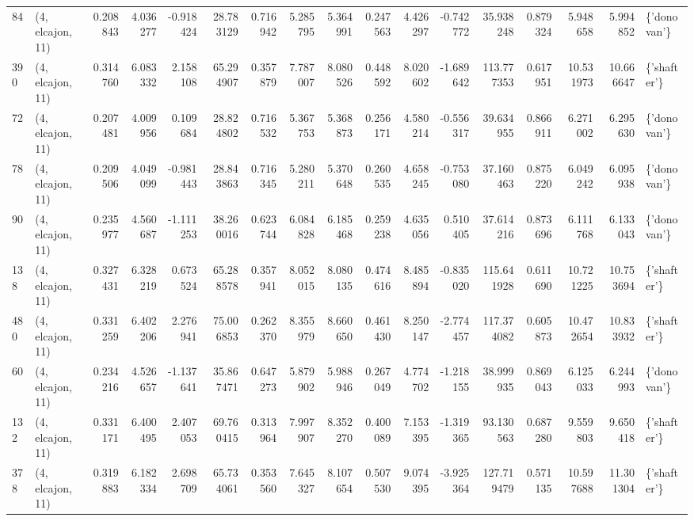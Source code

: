 \begin{tabular}{llrrrrrrrrrrrrrrl}
84  &  (4, elcajon, 11) &   0.208843 &   4.036277 &  -0.918424 &    28.783129 &   0.716942 &   5.285795 &   5.364991 &  0.247563 &   4.426297 &  -0.742772 &    35.938248 &   0.879324 &   5.948658 &   5.994852 &  \{'donovan'\} \\
390 &  (4, elcajon, 11) &   0.314760 &   6.083332 &   2.158108 &    65.294907 &   0.357879 &   7.787007 &   8.080526 &  0.448592 &   8.020602 &  -1.689642 &   113.777353 &   0.617951 &  10.531973 &  10.666647 &  \{'shafter'\} \\
72  &  (4, elcajon, 11) &   0.207481 &   4.009956 &   0.109684 &    28.824802 &   0.716532 &   5.367753 &   5.368873 &  0.256171 &   4.580214 &  -0.556317 &    39.634955 &   0.866911 &   6.271002 &   6.295630 &  \{'donovan'\} \\
78  &  (4, elcajon, 11) &   0.209506 &   4.049099 &  -0.981443 &    28.843863 &   0.716345 &   5.280211 &   5.370648 &  0.260535 &   4.658245 &  -0.753080 &    37.160463 &   0.875220 &   6.049242 &   6.095938 &  \{'donovan'\} \\
90  &  (4, elcajon, 11) &   0.235977 &   4.560687 &  -1.111253 &    38.260016 &   0.623744 &   6.084828 &   6.185468 &  0.259238 &   4.635056 &   0.510405 &    37.614216 &   0.873696 &   6.111768 &   6.133043 &  \{'donovan'\} \\
138 &  (4, elcajon, 11) &   0.327431 &   6.328219 &   0.673524 &    65.288578 &   0.357941 &   8.052015 &   8.080135 &  0.474616 &   8.485894 &  -0.835020 &   115.641928 &   0.611690 &  10.721225 &  10.753694 &  \{'shafter'\} \\
480 &  (4, elcajon, 11) &   0.331259 &   6.402206 &   2.276941 &    75.006853 &   0.262370 &   8.355979 &   8.660650 &  0.461430 &   8.250147 &  -2.774457 &   117.374082 &   0.605873 &  10.472654 &  10.833932 &  \{'shafter'\} \\
60  &  (4, elcajon, 11) &   0.234216 &   4.526657 &  -1.137641 &    35.867471 &   0.647273 &   5.879902 &   5.988946 &  0.267049 &   4.774702 &  -1.218155 &    38.999935 &   0.869043 &   6.125033 &   6.244993 &  \{'donovan'\} \\
132 &  (4, elcajon, 11) &   0.331171 &   6.400495 &   2.407053 &    69.760415 &   0.313964 &   7.997907 &   8.352270 &  0.400089 &   7.153395 &  -1.319365 &    93.130563 &   0.687280 &   9.559803 &   9.650418 &  \{'shafter'\} \\
378 &  (4, elcajon, 11) &   0.319883 &   6.182334 &   2.698709 &    65.734061 &   0.353560 &   7.645327 &   8.107654 &  0.507530 &   9.074395 &  -3.925364 &   127.719479 &   0.571135 &  10.597688 &  11.301304 &  \{'shafter'\} \\

\end{tabular}
